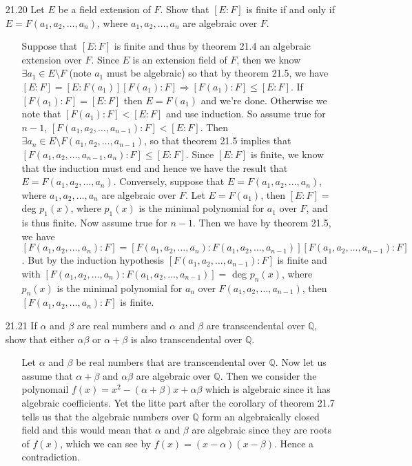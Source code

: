 \documentclass[12pt]{article}
\begin{document}
\begin{enumerate}
\item[21.20] Let $E$ be a field extension of $F$. Show that $[E:F]$ is finite if and only if
$E = F(a_1, a_2, \ldots, a_n)$, where $a_1, a_2, \ldots, a_n$ are algebraic over $F$.
\begin{enumerate}
\item[] Suppose that $[E: F]$ is finite and thus by theorem 21.4 an algebraic extension over $F$.
Since $E$ is an extension field of $F$, then we know
$\exists a_1 \in E\setminus F$ (note $a_1$ must be algebraic) 
so that by theorem 21.5, we have $[E:F] = [E:F(a_1)][F(a_1):F]
\Rightarrow [F(a_1):F] \leq [E:F]$. If $[F(a_1):F] = [E:F]$ then $E = F(a_1)$ and
we're done. Otherwise we note that $[F(a_1): F] < [E:F]$  and use induction. So assume
true for $n - 1$, $[F(a_1, a_2, \ldots, a_{n-1}): F] < [E:F]$. Then 
$\exists a_n \in E\setminus F(a_1, a_2, \ldots, a_{n-1})$, so that theorem 21.5 implies that
$[F(a_1, a_2, \ldots, a_{n-1}, a_n): F] \leq [E:F]$. Since $[E:F]$ is finite, we know that
the induction must end and hence we have the result that $E = F(a_1, a_2, \ldots, a_n)$.
Conversely, suppose that $E = F(a_1, a_2, \ldots, a_n)$, where $a_1, a_2, \ldots, a_n$ are
algebraic over $F$. Let $E = F(a_1)$, then $[E:F] =$ deg $p_1(x)$, where
$p_1(x)$ is the minimal polynomial for $a_1$ over $F$, and is thus finite. 
Now assume true for $n-1$. Then we have by theorem 21.5, we have
$[F(a_1, a_2, \ldots, a_n): F] = [F(a_1, a_2, \ldots, a_n):F(a_1, a_2, \ldots, a_{n-1})]
[F(a_1, a_2, \ldots, a_{n-1}):F]$. But by the induction hypothesis 
$[F(a_1, a_2, \ldots, a_{n-1}):F]$ is finite and with 
$[F(a_1, a_2, \ldots, a_n):F(a_1, a_2, \ldots, a_{n-1})] =$ deg $p_n(x)$, where
$p_n(x)$ is the minimal polynomial for $a_n$ over $F(a_1, a_2, \ldots, a_{n-1})$, 
then $[F(a_1, a_2, \ldots, a_n): F]$ is finite.
\end{enumerate}

\item[21.21] If $\alpha$ and $\beta$ are real numbers and $\alpha$ and $\beta$ are transcendental
over $\mathbb{Q}$, show that either $\alpha \beta$ or $\alpha + \beta$ is also transcendental
over $\mathbb{Q}$.
\begin{enumerate}
\item[] Let $\alpha$ and $\beta$ be real numbers that are transcendental over $\mathbb{Q}$.
Now let us assume that $\alpha + \beta$ and $\alpha \beta$ are algebraic over $\mathbb{Q}$. 
Then we consider the polynomail $f(x) = x^2 - (\alpha + \beta)x + \alpha \beta$ which is 
algebraic since it has algebraic coefficients. Yet the litte part after the corollary of
theorem 21.7 tells us that the algebraic numbers over $\mathbb{Q}$ 
form an algebraically closed field and this would mean that $\alpha$ and 
$\beta$ are algebraic since they are roots of $f(x)$,
which we can see by $f(x) = (x - \alpha)(x - \beta)$. Hence a contradiction.
\end{enumerate}


\end{enumerate}
\end{document}
